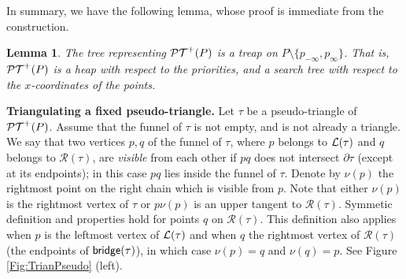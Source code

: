 \documentclass[11pt]{article}
\def\bridge{{\sf bridge}}
\def\PT{{\cal PT}}
\def\L{{\cal L}}
\def\R{\mathcal{R}}
\newtheorem{lemma}[theorem]{Lemma}
\begin{document}
In summary, we have the following lemma, whose proof is immediate from the construction.
\begin{lemma}\label{Lemma:treap}
  The tree representing $\PT^+(P)$ is a treap on $P\setminus\{p_{-\infty},p_{\infty}\}$. That is,
  $\PT^+(P)$ is a heap with respect to the \textit{priorities}, and
  a search tree with respect to the $x$-coordinates of the points.
\end{lemma}

\noindent
{\bf Triangulating a fixed pseudo-triangle.}
Let $\tau$ be a pseudo-triangle of $\PT^+(P)$. Assume that the funnel of
$\tau$ is not empty, and is not already a triangle. We say that two
vertices $p,q$ of the funnel of $\tau$, where $p$ belongs to $\L(\tau)$ and $q$
belongs to $\R(\tau)$, are \textit{visible} from each other if $pq$
does not intersect $\partial \tau$ (except at its endpoints); in this
case $pq$ lies inside the funnel of $\tau$. Denote by $\nu(p)$ the
rightmost point on the right chain which is visible from
$p$. Note that either $\nu(p)$ is the
rightmost vertex of $\tau$ or $p\nu(p)$ is an upper tangent to
$\R(\tau)$. Symmetic definition and properties hold for points $q$ on
$\R(\tau)$. This definition also applies when $p$ is the leftmost vertex of
$\L(\tau)$ and when $q$ the rightmost vertex of $\R(\tau)$ (the endpoints of $\bridge(\tau)$), in which case $\nu(p)=q$ and $\nu(q)=p$. See Figure \ref{Fig:TrianPseudo} (left).
\end{document}

